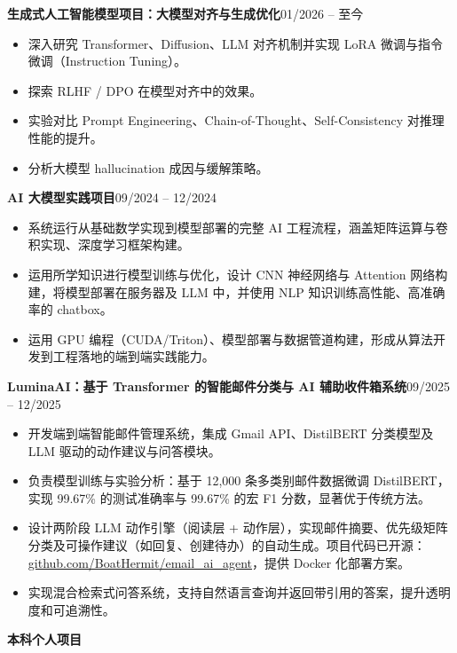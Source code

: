 \documentclass[a4paper,10pt]{article}
\newcommand{\entry}[2]{%
  \noindent\textbf{#1}\hfill#2\par%
}
\begin{document}
\vspace{5pt}
\entry{生成式人工智能模型项目：大模型对齐与生成优化}{01/2026 -- 至今}
\begin{itemize}
  \item 深入研究 Transformer、Diffusion、LLM 对齐机制并实现 LoRA 微调与指令微调（Instruction Tuning）。
  \item 探索 RLHF / DPO 在模型对齐中的效果。
  \item 实验对比 Prompt Engineering、Chain-of-Thought、Self-Consistency 对推理性能的提升。
  \item 分析大模型 hallucination 成因与缓解策略。
\end{itemize}

\vspace{5pt}
\entry{AI 大模型实践项目}{09/2024 -- 12/2024}
\begin{itemize}
  \item 系统运行从基础数学实现到模型部署的完整 AI 工程流程，涵盖矩阵运算与卷积实现、深度学习框架构建。
  \item 运用所学知识进行模型训练与优化，设计 CNN 神经网络与 Attention 网络构建，将模型部署在服务器及 LLM 中，并使用 NLP 知识训练高性能、高准确率的 chatbox。
  \item 运用 GPU 编程（CUDA/Triton）、模型部署与数据管道构建，形成从算法开发到工程落地的端到端实践能力。
\end{itemize}

\vspace{5pt}
\entry{LuminaAI：基于 Transformer 的智能邮件分类与 AI 辅助收件箱系统}{09/2025 -- 12/2025}
\begin{itemize}
  \item 开发端到端智能邮件管理系统，集成 Gmail API、DistilBERT 分类模型及 LLM 驱动的动作建议与问答模块。
  \item 负责模型训练与实验分析：基于 12,000 条多类别邮件数据微调 DistilBERT，实现 99.67\% 的测试准确率与 99.67\% 的宏 F1 分数，显著优于传统方法。
  \item 设计两阶段 LLM 动作引擎（阅读层 + 动作层），实现邮件摘要、优先级矩阵分类及可操作建议（如回复、创建待办）的自动生成。项目代码已开源：\href{https://github.com/BoatHermit/email_ai_agent}{github.com/BoatHermit/email\_ai\_agent}，提供 Docker 化部署方案。
  \item 实现混合检索式问答系统，支持自然语言查询并返回带引用的答案，提升透明度和可追溯性。
\end{itemize}

\vspace{6pt}
\noindent\textbf{本科个人项目}
\end{document}

